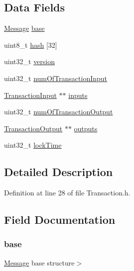 \subsection*{Data Fields}
\begin{DoxyCompactItemize}
\item 
\hyperlink{struct_message}{Message} \hyperlink{struct_transaction_a8987f797adf70c3e174fd64cc68bc933}{base}
\item 
uint8\_\-t \hyperlink{struct_transaction_a7ff9da008bf055da1f1ba994c562057d}{hash} \mbox{[}32\mbox{]}
\item 
uint32\_\-t \hyperlink{struct_transaction_acd99bb05ca015e7d74448acb1deba7ca}{version}
\item 
uint32\_\-t \hyperlink{struct_transaction_ab67f7dee599d2ca5988caa53883a44ed}{numOfTransactionInput}
\item 
\hyperlink{struct_transaction_input}{TransactionInput} $\ast$$\ast$ \hyperlink{struct_transaction_a00cc03d624a6aef1bfeadcbe9dcde0fe}{inputs}
\item 
uint32\_\-t \hyperlink{struct_transaction_aeeae027bddb846b239fd05e203c0c62a}{numOfTransactionOutput}
\item 
\hyperlink{struct_transaction_output}{TransactionOutput} $\ast$$\ast$ \hyperlink{struct_transaction_a0f4d7ecc12680c61da7267851e819cf0}{outputs}
\item 
uint32\_\-t \hyperlink{struct_transaction_aea4d95211b00c311b2d84c6177429162}{lockTime}
\end{DoxyCompactItemize}


\subsection{Detailed Description}


Definition at line 28 of file Transaction.h.



\subsection{Field Documentation}
\hypertarget{struct_transaction_a8987f797adf70c3e174fd64cc68bc933}{
\subsubsection[{base}]{ {\bf base}}}
\label{struct_transaction_a8987f797adf70c3e174fd64cc68bc933}
\hyperlink{struct_message}{Message} base structure$>$ 

